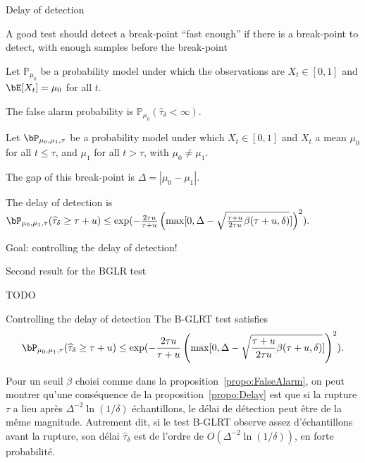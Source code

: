 \documentclass[11pt,english,ignorenonframetext,]{beamer}
\begin{document}
\begin{frame}{Delay of detection}

  A good test should detect a break-point ``fast enough'' if there is a break-point to detect, with enough samples before the break-point

  \begin{block}
    Let $\mathbb{P}_{\mu_0}$ be a probability model under which the observations are $X_t \in[0,1]$
    and $\bE[X_t] = \mu_0$ for all $t$.

    The \alert{false alarm probability} is $\mathbb{P}_{\mu_0}(\widehat{\tau}_\delta < \infty)$.
  \end{block}

  \begin{block}
    Let $\bP_{\mu_0,\mu_1,\tau}$ be a probability model under which $X_t \in[0,1]$ and $X_t$ a mean $\mu_0$ for all $t \leq \tau$, and $\mu_1$ for all $t > \tau$,
    with $\mu_0 \neq \mu_1$.
    
    The \alert{gap} of this break-point is $\Delta = |\mu_0 - \mu_1|$.

    The delay of detection is
    $\bP_{\mu_0,\mu_1,\tau} (\widehat{\tau}_{\delta} \geq \tau + u) \leq \exp( -\frac{2\tau u}{\tau + u}\left(\max[ 0, \Delta - \sqrt{\frac{\tau + u}{2\tau u} \beta(\tau + u,\delta)} ]\right)^2 ).$
  \end{block}

  \alert{Goal: controlling the delay of detection!}

\end{frame}

\begin{frame}{Second result for the BGLR test}

  TODO

  \begin{block}{Controlling the delay of detection}
      The B-GLRT test satisfies
      \[ \bP_{\mu_0,\mu_1,\tau} (\widehat{\tau}_{\delta} \geq \tau + u) \leq \exp( -\frac{2\tau u}{\tau + u}\left(\max[ 0, \Delta - \sqrt{\frac{\tau + u}{2\tau u} \beta(\tau + u,\delta)} ]\right)^2 ). \]
  \end{block}

  
Pour un seuil $\beta$ choisi comme dans la proposition~\ref{propo:FalseAlarm}, on peut montrer qu'une conséquence de la proposition~\ref{propo:Delay} est que si la rupture $\tau$ a lieu après $\Delta^{-2} \ln(1/\delta)$ échantillons, le délai de détection peut être de la même magnitude.
%
Autrement dit,
si le test B-GLRT observe assez d'échantillons avant la rupture,
son délai $\widehat{\tau}_\delta$ est de l'ordre de $O(\Delta^{-2} \ln(1/\delta))$, en forte probabilité.

\end{frame}
\end{document}
